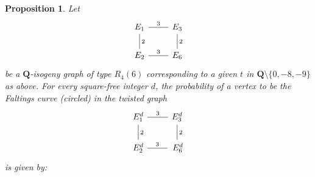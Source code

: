 \documentclass[11pt]{article}
\newtheorem{prop}[defn]{Proposition}
\theoremstyle{definition}
\begin{document}
\begin{prop}
Let 
\[ \begin{tikzcd}
E_1 \arrow[dash]{r}{3} 
    \arrow[dash]{d}{2} & 
    E_3  \arrow[dash]{d}{2} \\
 E_2 \arrow[dash]{r}{3} & E_6   
\end{tikzcd}
\]
be a $\mathbf{Q}$-isogeny graph of type $R_4(6)$ corresponding to a given $t$ in $\mathbf{Q}\setminus \{0,-8,-9\}$ as above. 
For every square-free integer $d$, 
the probability of a vertex
to be the Faltings curve (circled)
in the twisted graph 
\[ \begin{tikzcd}
E_1^d \arrow[dash]{r}{3}
    \arrow[dash]{d}{2} & 
    E_3^d  \arrow[dash]{d}{2} \\
 E_2^d \arrow[dash]{r}{3} &    \, E_6^d
\end{tikzcd}
\]
is given by:


\end{prop}
\end{document}
